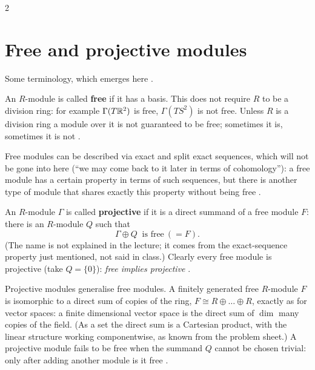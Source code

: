 \begin{paracol}{2}
\section{Free and projective modules}\label{sec:rm-projective}

Some terminology, which emerges here .

\begin{definition}\label{def:rm-free}
An $R$-module is called \textbf{free} if it has a basis. This does not require $R$ to be a division ring: for example $\Gamma(T\mathbb{R}^2)$ is free, $\Gamma(TS^2)$ is not free. Unless $R$ is a division ring a module over it is not guaranteed to be free; sometimes it is, sometimes it is not   .
\end{definition}
Free modules can be described via exact and split exact sequences, which will not be gone into here (``we may come back to it later in terms of cohomology''): a free module has a certain property in terms of such sequences, but there is another type of module that shares exactly this property without being free   .
\begin{definition}\label{def:rm-proj}
An $R$-module $\Gamma$ is called \textbf{projective} if it is a direct summand of a free module $F$: there is an $R$-module $Q$ such that
\[
  \Gamma\oplus Q\ \text{ is free}\ (=F).
\]
(The name is not explained in the lecture; it comes from the exact-sequence property just mentioned, not said in class.) Clearly every free module is projective (take $Q=\{0\}$): \emph{free implies projective}     .
\end{definition}
Projective modules generalise free modules. A finitely generated free $R$-module $F$ is isomorphic to a direct sum of copies of the ring, $F\cong R\oplus\dots\oplus R$, exactly as for vector spaces: a finite dimensional vector space is the direct sum of $\dim$ many copies of the field. (As a set the direct sum is a Cartesian product, with the linear structure working
componentwise, as known from the problem sheet.) A projective module fails to be free when the summand $Q$ cannot be chosen trivial: only after adding another module is it free     .


\end{paracol}
